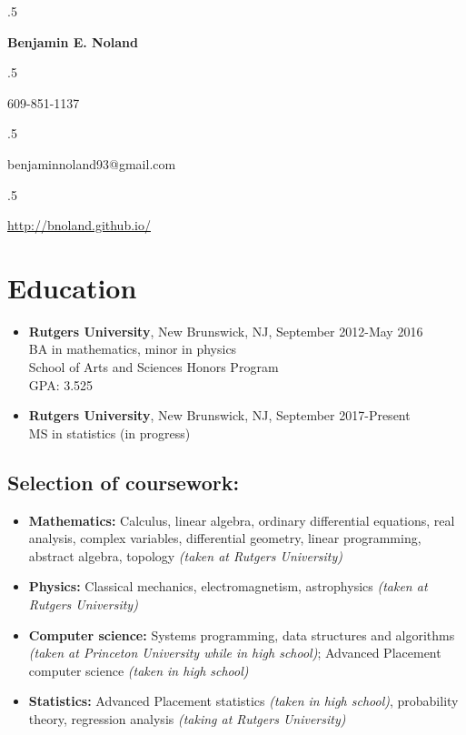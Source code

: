\documentclass[12pt]{article}
\begin{document}
\moveleft.5\hoffset\centerline{\Large\bf Benjamin E. Noland}
\smallskip
\moveleft.5\hoffset\centerline{609-851-1137}
\moveleft.5\hoffset\centerline{benjaminnoland93@gmail.com}
\moveleft.5\hoffset\centerline{\url{http://bnoland.github.io/}}

\section*{Education}

\begin{itemize}
\item
\textbf{Rutgers University}, New Brunswick, NJ, September 2012-May 2016 \\
BA in mathematics, minor in physics \\
School of Arts and Sciences Honors Program \\
GPA: 3.525

\item
\textbf{Rutgers University}, New Brunswick, NJ, September 2017-Present \\
MS in statistics (in progress)
\end{itemize}

\subsection*{Selection of coursework:}
\begin{itemize}
\item
\textbf{Mathematics:} Calculus, linear algebra, ordinary differential equations, real analysis, complex variables, differential geometry, linear programming, abstract algebra, topology \textit{(taken at Rutgers University)}

\item
\textbf{Physics:}
Classical mechanics, electromagnetism, astrophysics \textit{(taken at Rutgers University)}

\item
\textbf{Computer science:}
Systems programming, data structures and algorithms \textit{(taken at Princeton University while in high school)}; Advanced Placement computer science \textit{(taken in high school)}

\item
\textbf{Statistics:} Advanced Placement statistics \textit{(taken in high school)}, probability theory, regression analysis \textit{(taking at Rutgers University)}

\end{itemize}
\end{document}
